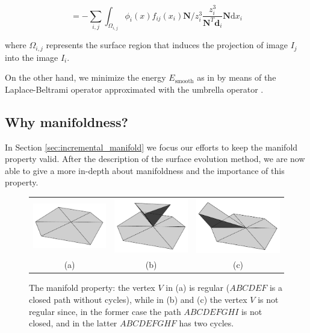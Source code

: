 \begin{equation}
\label{eq:final}
  =  - \sum_{i,j} \int_{\mathit{\Omega_{i,j}}} \phi_i(x)  f_{ij}(x_i)  \mathbf{N}/z_i^3 \frac{z_i^3}{\mathbf{N}^T \mathbf{d}_i }\mathbf{N} \textrm{d}x_i
\end{equation}

where $\Omega_{i,j}$ represents the surface region that induces the projection of image $I_j$ into the image $I_i$.

On the other hand, we minimize the energy $E_{\textrm{smooth}}$ as in \cite{vu_et_al_2012} by means of the Laplace-Beltrami operator approximated with the umbrella operator \cite{wardetzky2007discrete}.




\subsection{Why manifoldness?}
\label{subsec:why}
In Section \ref{sec:incremental_manifold} we focus our efforts to keep the manifold property valid.
After the description of the surface evolution method, we are now able to give a more in-depth about manifoldness and the importance of this property.


\begin{figure}[t]
\centering
\begin{tabular}{ccc}
\includegraphics[width=0.28\columnwidth]{img/ch-incr-dens/manifold}&
\includegraphics[width=0.28\columnwidth]{img/ch-incr-dens/notmanifold1}&
\includegraphics[width=0.28\columnwidth]{img/ch-incr-dens/notmanifold2}\\
(a)&(b)&(c)
\end{tabular}
\caption{The manifold property: the vertex $V$ in (a) is regular ($ABCDEF$ is a closed path without cycles), while in (b) and (c) the vertex $V$ is not regular since, in the former case the path $ABCDEFGHI$ is not closed, and in the latter $ABCDEFGHF$ has two cycles.}
\label{fig:vertexManifold}
\end{figure}


